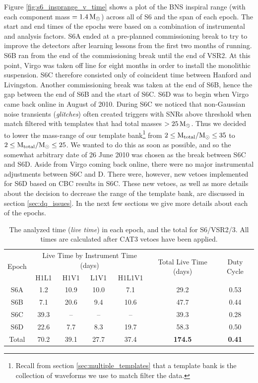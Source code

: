 Figure \ref{fig:s6_insprange_v_time} shows a plot of the \ac{BNS} inspiral
range (with each component mass $= 1.4\,\mathrm{M_\odot}$) across all of \ac{S6} and the
span of each epoch. The start and end times of the epochs were based on a
combination of instrumental and analysis factors. S6A ended at a pre-planned
commissioning break to try to improve the detectors after learning lessons from
the first two months of running. S6B ran from the end of the commissioning
break until the end of \ac{VSR2}. At this point, Virgo was taken off line for
eight months in order to install the monolithic suspension. S6C therefore
consisted only of coincident time between Hanford and Livingston. Another
commissioning break was taken at the end of S6B, hence the gap between the end
of S6B and the start of S6C. S6D was to begin when Virgo came back online in
August of 2010. During S6C we noticed that non-Gaussian noise transients
(\emph{glitches}) often created triggers with \acp{SNR} above threshold when
match filtered with templates that had total masses $> 25\,\mathrm{M_\odot}$. Thus we
decided to lower the mass-range of our template bank\footnote{Recall from
section \ref{sec:multiple_templates} that a template bank is the collection of
waveforms we use to match filter the data.} from $2 \leq \mathrm{M_{total}}/\mathrm{M_\odot} \leq 35$
to $2 \leq \mathrm{M_{total}}/\mathrm{M_\odot} \leq 25$. We wanted to do this as soon as possible,
and so the somewhat arbitrary date of 26 June 2010 was chosen as the break
between S6C and S6D. Aside from Virgo coming back online, there were no major
instrumental adjustments between S6C and D. There were, however, new vetoes
implemented for S6D based on \ac{CBC} results in S6C. These new vetoes, as well
as more details about the decision to decrease the range of the template bank,
are discussed in section \ref{sec:dq_issues}. In the next few sections we give
more details about each of the epochs.

\begin{table}[hbtp]
\center
\begin{tabular}{| c | c | c | c | c | c | c |}
\hline
\multirow{2}{*}{Epoch}   &  \multicolumn{4}{|c|}{Live Time by Instrument Time (days)}  &   \multirow{2}{*}{\parbox{2.3cm}{Total Live Time (days)}}  &    \multirow{2}{*}{Duty Cycle} \\
\cline{2-5}
    &  H1L1  &   H1V1   &   L1V1   &     H1L1V1 &   &   \\
\hline \hline
S6A     &   1.2 &   10.9    &   10.0    &   7.1  &   29.2    &   0.53 \\
\hline
S6B     &   7.1 &   20.6    &   9.4     &  10.6  &   47.7    &   0.44 \\
\hline
S6C     &   39.3    &   --  &   --      &   --   &   39.3    &   0.28 \\
\hline
S6D     &   22.6    &   7.7 &   8.3     &   19.7 &   58.3    &   0.50 \\
\hline \hline
Total   &   70.2    &   39.1 &  27.7    &   37.4 &   \textbf{174.5}   &   \textbf{0.41} \\
\hline
\end{tabular}
\caption{The analyzed time (\emph{live time}) in each epoch, and the total for S6/VSR2/3. All times are calculated after CAT3 vetoes have been applied.}
\label{tab:s6-livetimes}
\end{table}

